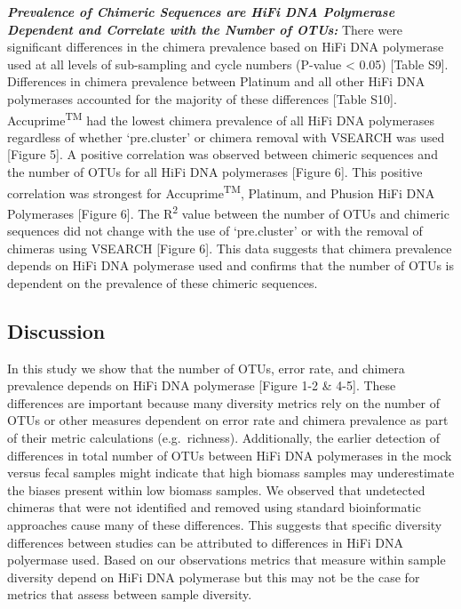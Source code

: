 \documentclass[12pt,]{article}
\begin{document}
\textbf{\emph{Prevalence of Chimeric Sequences are HiFi DNA Polymerase
Dependent and Correlate with the Number of OTUs:}} There were
significant differences in the chimera prevalence based on HiFi DNA
polymerase used at all levels of sub-sampling and cycle numbers (P-value
\textless{} 0.05) {[}Table S9{]}. Differences in chimera prevalence
between Platinum and all other HiFi DNA polymerases accounted for the
majority of these differences {[}Table S10{]}.
Accuprime\textsuperscript{TM} had the lowest chimera prevalence of all
HiFi DNA polymerases regardless of whether `pre.cluster' or chimera
removal with VSEARCH was used {[}Figure 5{]}. A positive correlation was
observed between chimeric sequences and the number of OTUs for all HiFi
DNA polymerases {[}Figure 6{]}. This positive correlation was strongest
for Accuprime\textsuperscript{TM}, Platinum, and Phusion HiFi DNA
Polymerases {[}Figure 6{]}. The R\textsuperscript{2} value between the
number of OTUs and chimeric sequences did not change with the use of
`pre.cluster' or with the removal of chimeras using VSEARCH {[}Figure
6{]}. This data suggests that chimera prevalence depends on HiFi DNA
polymerase used and confirms that the number of OTUs is dependent on the
prevalence of these chimeric sequences.

\newpage

\subsection{Discussion}\label{discussion}

In this study we show that the number of OTUs, error rate, and chimera
prevalence depends on HiFi DNA polymerase {[}Figure 1-2 \& 4-5{]}. These
differences are important because many diversity metrics rely on the
number of OTUs or other measures dependent on error rate and chimera
prevalence as part of their metric calculations (e.g.~richness).
Additionally, the earlier detection of differences in total number of
OTUs between HiFi DNA polymerases in the mock versus fecal samples might
indicate that high biomass samples may underestimate the biases present
within low biomass samples. We observed that undetected chimeras that
were not identified and removed using standard bioinformatic approaches
cause many of these differences. This suggests that specific diversity
differences between studies can be attributed to differences in HiFi DNA
polyermase used. Based on our observations metrics that measure within
sample diversity depend on HiFi DNA polymerase but this may not be the
case for metrics that assess between sample diversity.
\end{document}
